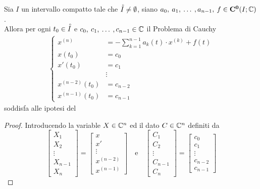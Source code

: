 \begin{proposition}
	\label{prop:cau_glob_lips_in_C}
	Sia $I$ un intervallo compatto tale che  $\accentset{\circ}{I} \neq \emptyset$, siano $a_0,\:a_1,\:\dotsc\:,a_{n-1},\:f\in\mathbf{C^{0}}(I;\mathbb{C})$.\\
	Allora per ogni $t_0 \in \accentset{\circ}{I}$ e $c_0,\:c_1,\:\dotsc\:,c_{n-1}\in\mathbb{C}$ il Problema di Cauchy
	\begin{align}
	\label{eq:eq_diff_lin_fun_n}
	\begin{cases}
		x^{(n)} &= -\sum_{k=1}^{n-1} a_k(t) \cdot x^{(k)} + f(t)\\
		x(t_0) &= c_0\\
		x'(t_0) &= c_1\\
		&\vdots\\
		x^{(n-2)}(t_0) &= c_{n-2}\\
		x^{(n-1)}(t_0) &= c_{n-1}
	\end{cases}
	\end{align}
	soddisfa alle ipotesi del 
	\begin{proof}
		Introducendo la variable $X \in \mathbb{C}^n$ ed il dato $C \in \mathbb{C}^n$ definiti da
		\begin{equation*}
			\left[\begin{matrix} X_1\\X_2\\\vdots\\X_{n-1}\\X_n \end{matrix}\right] = \left[\begin{matrix} x\\ x'\\\vdots\\ x^{(n-2)}\\x^{(n-1)} \end{matrix}\right]
			\quad\text{e}\quad
			\left[\begin{matrix} C_1\\C_2\\\vdots\\C_{n-1}\\C_{n} \end{matrix}\right] = \left[\begin{matrix} c_0\\c_1\\\vdots\\ c_{n-2}\\c_{n-1} \end{matrix}\right]
		\end{equation*}

\end{proof}
\end{proposition}
